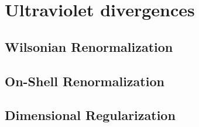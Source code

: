 \chapter{Ultraviolet divergences}
\label{chap:qed}

\section{Wilsonian Renormalization}

\section{On-Shell Renormalization}

\section{Dimensional Regularization}